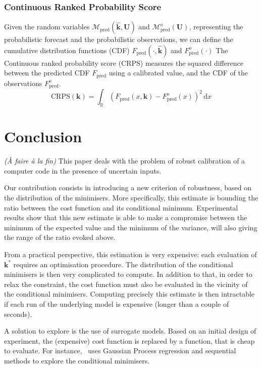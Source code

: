 \documentclass[preprint, 1p]{elsarticle}
\newcommand{\kest}{\hat{\mathbf{k}}}
\newcommand{\victor}[1]{{\itshape\color{green} ({#1})}}
\begin{document}
\subsubsection{Continuous Ranked Probability Score}
Given the random variables $\mathcal{M}_{\mathrm{pred}}(\kest, \mathbf{U})$ and $\mathcal{M}_{\mathrm{pred}}^o(\mathbf{U})$, representing the probabilistic forecast and the probabilistic observations, we can define the cumulative distribution functions (CDF) $F_{\mathrm{pred}}(\cdot, \kest)$ and $F^o_{\mathrm{pred}}(\cdot)$
The Continuous ranked probability score (CRPS) measures the squared difference between the predicted CDF $F_{\mathrm{pred}}$ using a calibrated value, and the CDF of the observations $F_{\mathrm{pred}}^o$. 
\begin{equation}
\label{eq:def_crps}
\mathrm{CRPS}(\mathbf{k}) = \int_{\mathbb{R}} (F_{\mathrm{pred}}(x,\mathbf{k}) - F^o_{\mathrm{pred}}(x))^2 \,\mathrm{d}x
\end{equation}

\clearpage
\section*{Conclusion}  
\victor{À faire à la fin}
This paper deals with the problem of robust calibration of a computer code in the presence of uncertain inputs. 

Our contribution consists in introducing a new criterion of robustness, based on the distribution of the minimisers. More specifically, this estimate is bounding the ratio between the cost function and its conditional minimum.
Experimental results show that this new estimate is able to make a compromise between the minimum of the expected value and the minimum of the variance, will also giving the range of the ratio evoked above.

From a practical perspective, this estimation is very expensive: each evaluation of $\mathbf{k}^*$ requires an optimisation procedure. The distribution of the conditional minimisers is then very complicated to compute.
In addition to that, in order to relax the constraint, the cost function must also be evaluated in the vicinity of the conditional minimisers. Computing precisely this estimate is then intractable if each run of the underlying model is expensive (longer than a couple of seconds).


A solution to explore is the use of surrogate models. Based on an initial design of experiment, the (expensive) cost function is replaced by a function, that is cheap to evaluate.
For instance,~\cite{ginsbourger_bayesian_2014}
uses Gaussian Process regression and sequential methods to explore the conditional minimisers.
\end{document}
